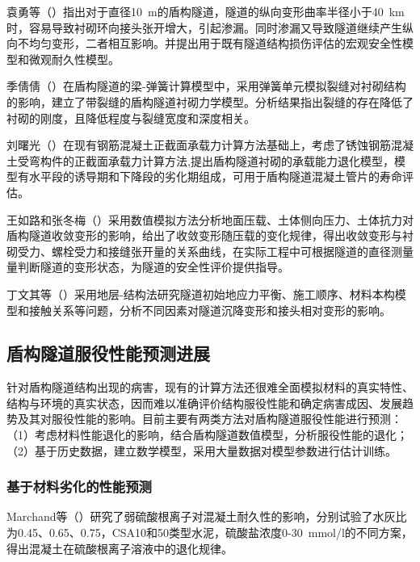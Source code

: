 袁勇等（\citeyear{袁勇2006运营越江隧道服役现状调查与检测评估}）指出对于直径10~m的盾构隧道，隧道的纵向变形曲率半径小于40~km时，容易导致衬砌环向接头张开增大，引起渗漏。同时渗漏又导致隧道继续产生纵向不均匀变形，二者相互影响。并提出用于既有隧道结构损伤评估的宏观安全性模型和微观耐久性模型。

季倩倩（\citeyear{季倩倩2009带裂缝的盾构隧道衬砌力学模型研究}）在盾构隧道的梁-弹簧计算模型中，采用弹簧单元模拟裂缝对衬砌结构的影响，建立了带裂缝的盾构隧道衬砌力学模型。分析结果指出裂缝的存在降低了衬砌的刚度，且降低程度与裂缝宽度和深度相关。

刘曙光（\citeyear{刘曙光2012盾构隧道混凝土管片的承载力退化模型}）在现有钢筋混凝土正截面承载力计算方法基础上，考虑了锈蚀钢筋混凝土受弯构件的正截面承载力计算方法,提出盾构隧道衬砌的承载能力退化模型，模型有水平段的诱导期和下降段的劣化期组成，可用于盾构隧道混凝土管片的寿命评估。

王如路和张冬梅（\citeyear{王如路2013超载作用下软土盾构隧道横向变形机理及控制指标研究}）采用数值模拟方法分析地面压载、土体侧向压力、土体抗力对盾构隧道收敛变形的影响，给出了收敛变形随压载的变化规律，得出收敛变形与衬砌受力、螺栓受力和接缝张开量的关系曲线，在实际工程中可根据隧道的直径测量量判断隧道的变形状态，为隧道的安全性评价提供指导。

丁文其等（\citeyear{丁文其2013基于地层}）采用地层-结构法研究隧道初始地应力平衡、施工顺序、材料本构模型和接触关系等问题，分析不同因素对隧道沉降变形和接头相对变形的影响。

\subsection{盾构隧道服役性能预测进展}

针对盾构隧道结构出现的病害，现有的计算方法还很难全面模拟材料的真实特性、结构与环境的真实状态，因而难以准确评价结构服役性能和确定病害成因、发展趋势及其对服役性能的影响。目前主要有两类方法对盾构隧道服役性能进行预测：（1）考虑材料性能退化的影响，结合盾构隧道数值模型，分析服役性能的退化；（2）基于历史数据，建立数学模型，采用大量数据对模型参数进行估计训练。

\subsubsection{基于材料劣化的性能预测}

Marchand等（\citeyear{Marchand2002Theoretical}）研究了弱硫酸根离子对混凝土耐久性的影响，分别试验了水灰比为0.45、0.65、0.75，CSA10和50类型水泥，硫酸盐浓度0-30~mmol/l的不同方案，得出混凝土在硫酸根离子溶液中的退化规律。

